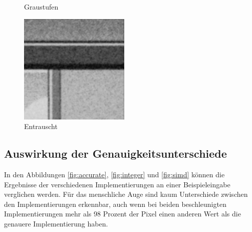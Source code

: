 \documentclass[course=erap]{aspdoc}
\begin{document}
\begin{figure}
\begin{minipage}[t]{.33\linewidth}
        \caption{Graustufen}
        \label{fig:detail_graustufen}
    \end{minipage}%
    \begin{minipage}[t]{.33\linewidth}
        \centering
        \includegraphics[width=\linewidth]{Image/Sample_VideoCall/denoisedvideocall_detail.png}
        \caption{Entrauscht}
        \label{fig:detail_entrauscht}
    \end{minipage}
\end{figure}



\subsection{Auswirkung der Genauigkeitsunterschiede}
In den Abbildungen \ref{fig:accurate}, \ref{fig:integer} und \ref{fig:simd}
können die Ergebnisse der verschiedenen Implementierungen an einer Beispieleingabe verglichen werden. Für das menschliche Auge sind kaum Unterschiede zwischen den Implementierungen erkennbar, auch wenn bei beiden beschleunigten Implementierungen mehr als 98 Prozent der Pixel einen anderen Wert als die genauere Implementierung haben.
\end{document}
